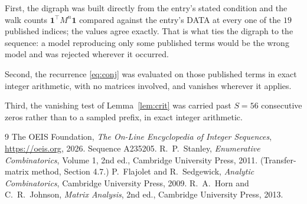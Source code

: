 \documentclass[11pt,a4paper]{article}
\theoremstyle{plain}
\theoremstyle{definition}
\begin{document}
First, the digraph was built directly from the entry's stated condition and the walk counts
$\mathbf{1}^{\!\top}M^{n}\mathbf{1}$ compared against the entry's DATA at every one of
the $19$ published indices; the values agree exactly. That is what ties the digraph to
the sequence: a model reproducing only some published terms would be the wrong model and
was rejected wherever it occurred.

Second, the recurrence \eqref{eq:conj} was evaluated on those published terms in exact
integer arithmetic, with no matrices involved, and vanishes wherever it applies.

Third, the vanishing test of Lemma~\ref{lem:crit} was carried past $S=56$ consecutive
zeros rather than to a sampled prefix, in exact integer arithmetic.

\begin{thebibliography}{9}
 The OEIS Foundation, \emph{The On-Line Encyclopedia of Integer
Sequences}, \url{https://oeis.org}, 2026. Sequence A235205.
 R.~P.~Stanley, \emph{Enumerative Combinatorics}, Volume 1, 2nd ed.,
Cambridge University Press, 2011. (Transfer-matrix method, Section 4.7.)
 P.~Flajolet and R.~Sedgewick, \emph{Analytic Combinatorics}, Cambridge
University Press, 2009.
 R.~A.~Horn and C.~R.~Johnson, \emph{Matrix Analysis}, 2nd ed., Cambridge
University Press, 2013.
\end{thebibliography}
\end{document}
